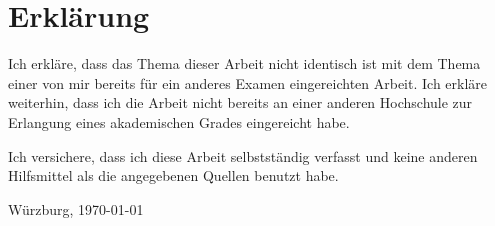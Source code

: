 \documentclass[paper=a4,
					fontsize=12pt,
				headsepline,
				cleardoublepage=plain,
				numbers=noenddot,
				bibliography=totoc,
				enabledeprecatedfontcommands]{scrbook}
\begin{document}
\maketitle
\tableofcontents












\appendix








\pagestyle{plain}




\chapter*{Erklärung}
Ich erkläre, dass das Thema dieser Arbeit nicht identisch ist mit dem Thema
einer von mir bereits für ein anderes Examen eingereichten Arbeit. Ich erkläre
weiterhin, dass ich die Arbeit nicht bereits an einer anderen Hochschule zur
Erlangung eines akademischen Grades eingereicht habe.

Ich versichere, dass ich diese Arbeit selbstständig verfasst und keine
anderen Hilfsmittel als die angegebenen Quellen benutzt habe.

\vspace{3cm}
\setlength{\parindent}{0pt}
Würzburg, \today
\end{document}
